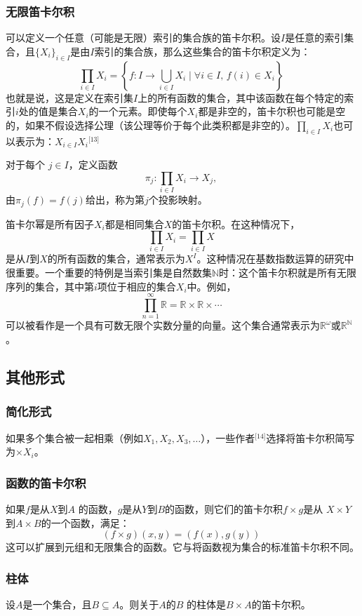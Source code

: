 \subsubsection{无限笛卡尔积} 
可以定义一个任意（可能是无限）索引的集合族的笛卡尔积。设\( I \)是任意的索引集合，且\( \{X_i\}_{i \in I} \)是由\( I \)索引的集合族，那么这些集合的笛卡尔积定义为：
\[
\prod_{i \in I} X_i = \left\{ f : I \to \bigcup_{i \in I} X_i \mid \forall i \in I, \, f(i) \in X_i \right\}~
\]
也就是说，这是定义在索引集\( I \)上的所有函数的集合，其中该函数在每个特定的索引\( i \)处的值是集合\( X_i \)的一个元素。即使每个\( X_i \)都是非空的，笛卡尔积也可能是空的，如果不假设选择公理（该公理等价于每个此类积都是非空的）。\(\prod_{i \in I} X_i\)也可以表示为：\(X_{i \in I} X_i\)\(^\text{[13]}\)

对于每个 \( j \in I \)，定义函数  
\[
\pi_j: \prod_{i \in I} X_i \to X_j,~
\]  
由\(\pi_j(f) = f(j)\)给出，称为第\( j \)个投影映射。

笛卡尔幂是所有因子\( X_i \)都是相同集合\( X \)的笛卡尔积。在这种情况下，  
\[
\prod_{i \in I} X_i = \prod_{i \in I} X~
\]  
是从\( I \)到\( X \)的所有函数的集合，通常表示为\( X^I \)。这种情况在基数指数运算的研究中很重要。一个重要的特例是当索引集是自然数集\( \mathbb{N} \)时：这个笛卡尔积就是所有无限序列的集合，其中第\( i \)项位于相应的集合\( X_i \)中。例如，  
\[
\prod_{n=1}^{\infty} \mathbb{R} = \mathbb{R} \times \mathbb{R} \times \cdots~
\]  
可以被看作是一个具有可数无限个实数分量的向量。这个集合通常表示为\( \mathbb{R}^\omega \)或\( \mathbb{R}^{\mathbb{N}} \)。
\subsection{其他形式} 
\subsubsection{简化形式}  
如果多个集合被一起相乘（例如\( X_1, X_2, X_3, \dots \)），一些作者\(^\text{[14]}\)选择将笛卡尔积简写为\( \times X_i \)。
\subsubsection{函数的笛卡尔积 } 
如果\( f \)是从\( X \)到\( A \) 的函数，\( g \)是从\( Y \)到\( B \)的函数，则它们的笛卡尔积\( f \times g \)是从 \( X \times Y \)到\( A \times B \)的一个函数，满足：
\[
(f \times g)(x, y) = (f(x), g(y))~
\]
这可以扩展到元组和无限集合的函数。它与将函数视为集合的标准笛卡尔积不同。
\subsubsection{柱体}  
设\( A \)是一个集合，且\( B \subseteq A \)。则关于\( A \)的\( B \) 的柱体是\( B \times A \)的笛卡尔积。

